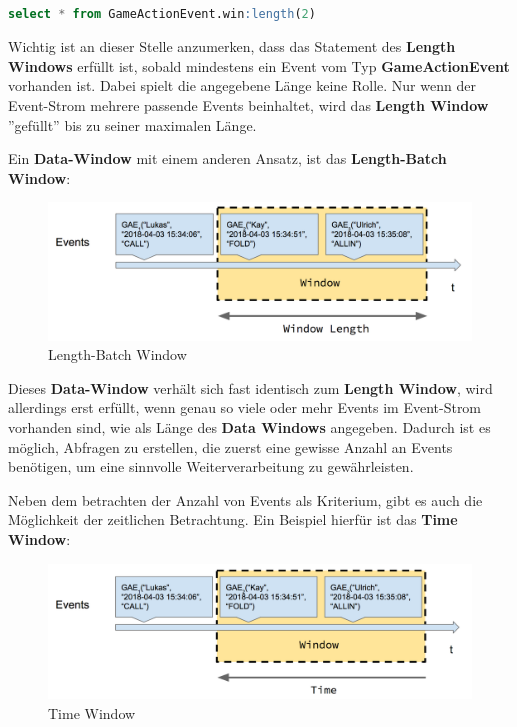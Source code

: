 \begin{lstlisting}[caption={Statement mit Length Window},label=length_select,captionpos=b,language=SQL]

select * from GameActionEvent.win:length(2)

\end{lstlisting}

Wichtig ist an dieser Stelle anzumerken, dass das Statement des \textbf{Length Windows} erfüllt ist, sobald mindestens ein Event vom Typ \textbf{GameActionEvent} vorhanden ist. Dabei spielt die angegebene Länge keine Rolle. Nur wenn der Event-Strom mehrere passende Events beinhaltet, wird das \textbf{Length Window} ''gefüllt'' bis zu seiner maximalen Länge.

Ein \textbf{Data-Window} mit einem anderen Ansatz, ist das \textbf{Length-Batch Window}:

\begin{figure}[ht]
	\centering
	\includegraphics[width=\textwidth,height=\textheight,keepaspectratio]{images/data_window_length_batch.png}
	\caption{Length-Batch Window}
	\label{LengthBatchWindow}
\end{figure}

Dieses \textbf{Data-Window} verhält sich fast identisch zum \textbf{Length Window}, wird allerdings erst erfüllt, wenn genau so viele oder mehr Events im Event-Strom vorhanden sind, wie als Länge des \textbf{Data Windows} angegeben. Dadurch ist es möglich, Abfragen zu erstellen, die zuerst eine gewisse Anzahl an Events benötigen, um eine sinnvolle Weiterverarbeitung zu gewährleisten.

Neben dem betrachten der Anzahl von Events als Kriterium, gibt es auch die Möglichkeit der zeitlichen Betrachtung. Ein Beispiel hierfür ist das \textbf{Time Window}:

\begin{figure}[ht]
	\centering
	\includegraphics[width=\textwidth,height=\textheight,keepaspectratio]{images/data_window_time.png}
	\caption{Time Window}
	\label{TimeWindow}
\end{figure}

